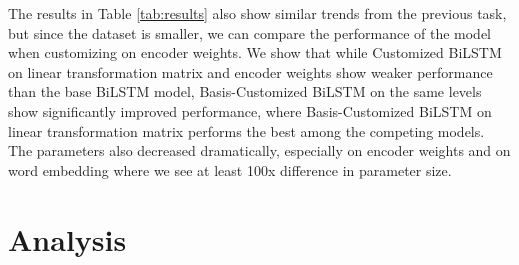 \documentclass[11pt,a4paper]{article}
\begin{document}
The results in Table \ref{tab:results} also show similar trends from the previous task, but since the dataset is smaller, we can compare the performance of the model when customizing on encoder weights. We show that while Customized BiLSTM on linear transformation matrix and encoder weights show weaker performance than the base BiLSTM model, Basis-Customized BiLSTM on the same levels show significantly improved performance, where Basis-Customized BiLSTM on linear transformation matrix performs the best among the competing models. The parameters also decreased dramatically, especially on encoder weights and on word embedding where we see at least 100x difference in parameter size.

\section{Analysis}
\end{document}
